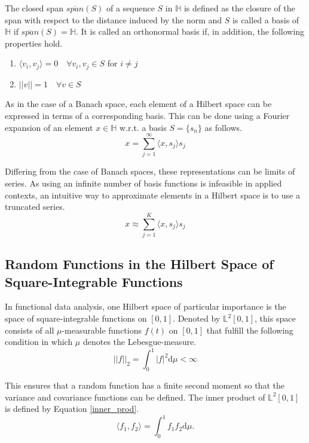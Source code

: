 \documentclass[11pt,twoside,a4paper]{article}
\begin{document}
	The closed span $\overline{span}(S)$ of a sequence $S$ in $\mathbb{H}$ is defined as the closure of the span with respect to the distance induced by the norm and $S$ is called a basis of $\mathbb{H}$ if $\overline{span}(S) = \mathbb{H}$.	It is called an orthonormal basis if, in addition, the following properties hold. 
	\begin{multicols}{2}
		\begin{enumerate}
			\item $\langle v_i, v_j \rangle = 0 \quad \forall v_i, v_j \in S $ for $i \neq j$
			\item $\lvert \lvert v \rvert \rvert = 1 \quad \forall v \in S$
		\end{enumerate}
	\end{multicols}

	As in the case of a Banach space, each element of a Hilbert space can be expressed in terms of a corresponding basis. This can be done using a Fourier expansion of an element $x \in \mathbb{H}$ w.r.t. a basis $S = \{s_n\}$ as follows.
	\begin{equation}
		x = \sum_{j = 1}^{\infty}{\langle x, s_j \rangle}s_j
	\end{equation}
	
	Differing from the case of Banach spaces, these representations can be limits of series. As using an infinite number of basis functions is infeasible in applied contexts, an intuitive way to approximate elements in a Hilbert space is to use a truncated series.
	\begin{equation}
		x \approx \sum_{j = 1}^{K}{\langle x, s_j \rangle}s_j
	\end{equation}
	
	\subsection{Random Functions in the Hilbert Space of Square-Integrable Functions}
	In functional data analysis, one Hilbert space of particular importance is the space of square-integrable functions on $[0,1]$. Denoted by $\mathbb{L}^2[0,1]$, this space consists of all $\mu$-measurable functions $f(t)$ on $[0,1]$ that fulfill the following condition in which $\mu$ denotes the Lebesgue-measure.
	\begin{equation}
		\lvert \lvert f \rvert \rvert_2 = \int_{0}^{1} \lvert f \rvert^2 \mathrm{d}\mu < \infty
	\end{equation}
	
	This ensures that a random function has a finite second moment so that the variance and covariance functions can be defined. The inner product of $\mathbb{L}^2[0,1]$ is defined by Equation \ref{inner_prod}.
	\begin{equation}\label{inner_prod}
		\langle f_1, f_2 \rangle = \int_{0}^{1} f_1 f_2 \mathrm{d}\mu.
	\end{equation}
	
\end{document}
